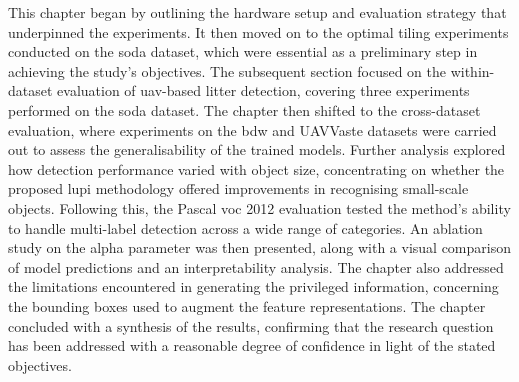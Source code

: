 This chapter began by outlining the hardware setup and evaluation strategy that underpinned the experiments. It then moved on to the optimal tiling experiments conducted on the \gls{soda} dataset, which were essential as a preliminary step in achieving the study's objectives. The subsequent section focused on the within-dataset evaluation of \gls{uav}-based litter detection, covering three experiments performed on the \gls{soda} dataset. The chapter then shifted to the cross-dataset evaluation, where experiments on the \gls{bdw} and UAVVaste datasets were carried out to assess the generalisability of the trained models. Further analysis explored how detection performance varied with object size, concentrating on whether the proposed \gls{lupi} methodology offered improvements in recognising small-scale objects. Following this, the Pascal \gls{voc} 2012 evaluation tested the method’s ability to handle multi-label detection across a wide range of categories. An ablation study on the alpha parameter was then presented, along with a visual comparison of model predictions and an interpretability analysis. The chapter also addressed the limitations encountered in generating the privileged information, concerning the bounding boxes used to augment the feature representations. The chapter concluded with a synthesis of the results, confirming that the research question has been addressed with a reasonable degree of confidence in light of the stated objectives.

